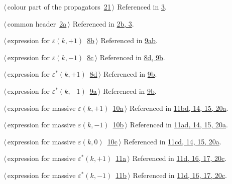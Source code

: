 \documentclass[a4paper,12pt]{amsart}
\renewcommand{\NWlink}[2]{\hyperlink{#1}{#2}}
\renewcommand{\NWtxtRefIn}{Referenced in}
\begin{document}
{\small\begin{list}{}{\setlength{\itemsep}{-\parsep}\setlength{\itemindent}{-\leftmargin}}
\item $\langle\,$colour part of the propagators\nobreak\ {\footnotesize \NWlink{nuweb21}{21}}$\,\rangle$ {\footnotesize {\NWtxtRefIn} \NWlink{nuweb3}{3}.}
\item $\langle\,$common header\nobreak\ {\footnotesize \NWlink{nuweb2a}{2a}}$\,\rangle$ {\footnotesize {\NWtxtRefIn} \NWlink{nuweb2b}{2b}\NWlink{nuweb3}{, 3}.
}
\item $\langle\,$expression for $\varepsilon(k, +1)$\nobreak\ {\footnotesize \NWlink{nuweb8b}{8b}}$\,\rangle$ {\footnotesize {\NWtxtRefIn} \NWlink{nuweb9a}{9a}\NWlink{nuweb9b}{b}.
}
\item $\langle\,$expression for $\varepsilon(k, -1)$\nobreak\ {\footnotesize \NWlink{nuweb8c}{8c}}$\,\rangle$ {\footnotesize {\NWtxtRefIn} \NWlink{nuweb8d}{8d}\NWlink{nuweb9b}{, 9b}.
}
\item $\langle\,$expression for $\varepsilon^\ast(k, +1)$\nobreak\ {\footnotesize \NWlink{nuweb8d}{8d}}$\,\rangle$ {\footnotesize {\NWtxtRefIn} \NWlink{nuweb9b}{9b}.}
\item $\langle\,$expression for $\varepsilon^\ast(k, -1)$\nobreak\ {\footnotesize \NWlink{nuweb9a}{9a}}$\,\rangle$ {\footnotesize {\NWtxtRefIn} \NWlink{nuweb9b}{9b}.}
\item $\langle\,$expression for massive $\varepsilon(k, +1)$\nobreak\ {\footnotesize \NWlink{nuweb10a}{10a}}$\,\rangle$ {\footnotesize {\NWtxtRefIn} \NWlink{nuweb11b}{11b}\NWlink{nuweb11d}{d}\NWlink{nuweb14}{, 14}\NWlink{nuweb15}{, 15}\NWlink{nuweb20a}{, 20a}.
}
\item $\langle\,$expression for massive $\varepsilon(k, -1)$\nobreak\ {\footnotesize \NWlink{nuweb10b}{10b}}$\,\rangle$ {\footnotesize {\NWtxtRefIn} \NWlink{nuweb11a}{11a}\NWlink{nuweb11d}{d}\NWlink{nuweb14}{, 14}\NWlink{nuweb15}{, 15}\NWlink{nuweb20a}{, 20a}.
}
\item $\langle\,$expression for massive $\varepsilon(k, 0)$\nobreak\ {\footnotesize \NWlink{nuweb10c}{10c}}$\,\rangle$ {\footnotesize {\NWtxtRefIn} \NWlink{nuweb11c}{11c}\NWlink{nuweb11d}{d}\NWlink{nuweb14}{, 14}\NWlink{nuweb15}{, 15}\NWlink{nuweb20a}{, 20a}.
}
\item $\langle\,$expression for massive $\varepsilon^\ast(k, +1)$\nobreak\ {\footnotesize \NWlink{nuweb11a}{11a}}$\,\rangle$ {\footnotesize {\NWtxtRefIn} \NWlink{nuweb11d}{11d}\NWlink{nuweb16}{, 16}\NWlink{nuweb17}{, 17}\NWlink{nuweb20c}{, 20c}.
}
\item $\langle\,$expression for massive $\varepsilon^\ast(k, -1)$\nobreak\ {\footnotesize \NWlink{nuweb11b}{11b}}$\,\rangle$ {\footnotesize {\NWtxtRefIn} \NWlink{nuweb11d}{11d}\NWlink{nuweb16}{, 16}\NWlink{nuweb17}{, 17}\NWlink{nuweb20c}{, 20c}.
}
\end{list}}
\end{document}

